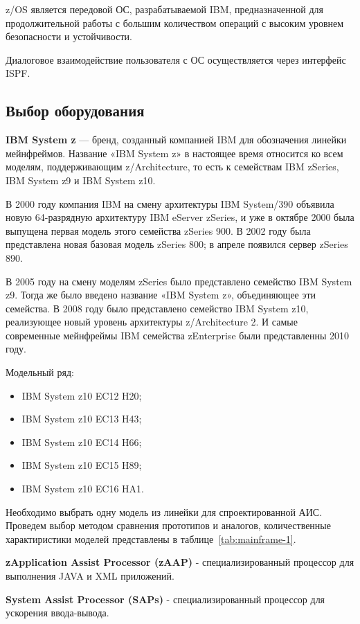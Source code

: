 \documentclass[russian,utf8,emptystyle]{eskdtext}
\begin{document}
z/OS является передовой ОС, разрабатываемой IBM, предназначенной для продолжительной работы с большим количеством операций с высоким уровнем безопасности и устойчивости.

Диалоговое взаимодействие пользователя с ОС осуществляется через интерфейс ISPF.

\subsection{Выбор оборудования}
\textbf{IBM System z} — бренд, созданный компанией IBM для обозначения линейки мейнфреймов. Название «IBM System z» в настоящее время относится ко всем моделям, поддерживающим z/Architecture, то есть к семействам IBM zSeries, IBM System z9 и IBM System z10.

В 2000 году компания IBM на смену архитектуры IBM System/390 объявила новую 64-разрядную архитектуру IBM eServer zSeries, и уже в октябре 2000 была выпущена первая модель этого семейства zSeries 900. В 2002 году была представлена новая базовая модель zSeries 800; в апреле появился сервер zSeries 890.

В 2005 году на смену моделям zSeries было представлено семейство IBM System z9. Тогда же было введено название «IBM System z», объединяющее эти семейства. В 2008 году было представлено семейство IBM System z10, реализующее новый уровень архитектуры z/Architecture 2. И самые современные мейнфреймы IBM семейства zEnterprise были представленны 2010 году.

Модельный ряд:
\begin{itemize}[label=-]
\item IBM System z10 EC12 H20;
\item IBM System z10 EC13 H43;
\item IBM System z10 EC14 H66;
\item IBM System z10 EC15 H89;
\item IBM System z10 EC16 HA1.
\end{itemize}

Необходимо выбрать одну модель из линейки для спроектированной АИС. Проведем выбор методом сравнения прототипов и аналогов, количественные характиристики моделей представлены в таблице~\ref{tab:mainframe-1}.

\textbf{zApplication Assist Processor (zAAP)} - специализированный процессор для выполнения JAVA и XML приложений.

\textbf{System Assist Processor (SAPs)} - специализированный процессор для ускорения ввода-вывода.
\end{document}
